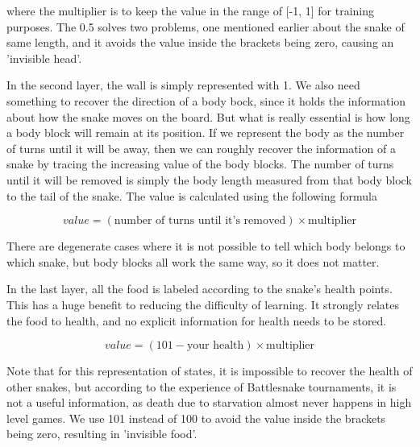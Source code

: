 \documentclass{article}
\begin{document}
where the multiplier is to keep the value in the range of [-1, 1] for training
purposes. The 0.5 solves two problems, one mentioned earlier about the snake of
same length, and it avoids the value inside the brackets being zero, causing an
'invisible head'.

In the second layer, the wall is simply represented with 1. We also need
something to recover the direction of a body bock, since it holds the
information about how the snake moves on the board. But what is really essential
is how long a body block will remain at its position. If we represent the body
as the number of turns until it will be away, then we can roughly recover the
information of a snake by tracing the increasing value of the body blocks. The
number of turns until it will be removed is simply the body length measured from
that body block to the tail of the snake. The value is calculated using the
following formula

\begin{equation}
  value = (\text{number of turns until it's removed}) \times \text{multiplier}
\end{equation}

There are degenerate cases where it is not possible to tell which body belongs
to which snake, but body blocks all work the same way, so it does not matter.

In the last layer, all the food is labeled according to the snake's health points. This
has a huge benefit to reducing the difficulty of learning. It strongly relates
the food to health, and no explicit information for health needs to be
stored.

\begin{equation}
  value = (101-\text{your health}) \times \text{multiplier}
\end{equation}

Note that for this representation of states, it is impossible to recover the health of other snakes, but
according to the experience of Battlesnake tournaments, it is not a useful
information, as death due to starvation almost never happens in high level
games. We use 101 instead of 100 to avoid the value inside the brackets being
zero, resulting in 'invisible food'.
\end{document}
